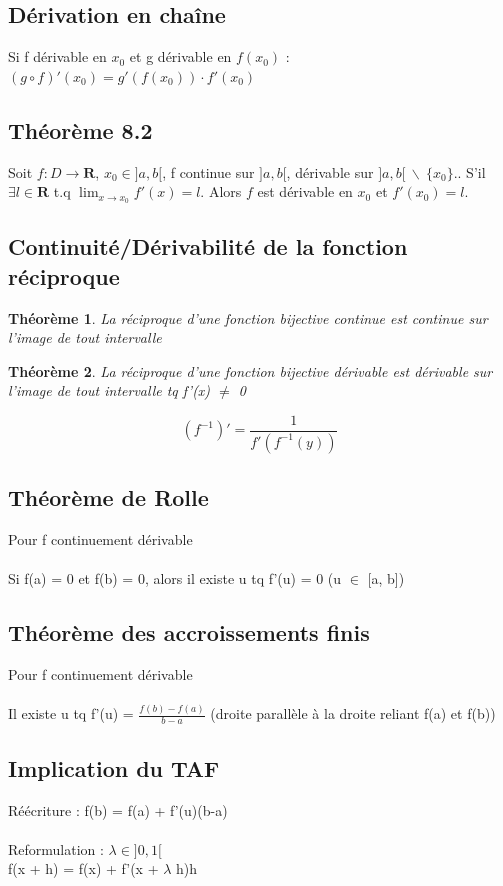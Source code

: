\documentclass{article}
\newtheorem{theorem}{Théorème}
\begin{document}
\subsection{Dérivation en chaîne}

Si f dérivable en $ x_0 $ et g dérivable en $ f(x_0) $ :\\
$(g \circ f)'(x_0) = g'(f(x_0)) \cdot f'(x_0)$

\subsection{Théorème 8.2}

Soit $ f : D \to \mathbf{R} $, $ x_0 \in ]a, b[ $, f continue sur $ ]a, b[ $, dérivable sur $ ]a, b[\ \backslash\ \{x_0\}. $. S'il $ \exists l \in \mathbf{R} $ t.q $ \lim_{x\to{x_0}} f'(x) = l $. Alors $ f $ est dérivable en $ x_0 $ et $ f'(x_0) = l $.
\subsection{Continuité/Dérivabilité de la fonction réciproque}
\begin{theorem}
    La réciproque d'une fonction bijective continue est continue sur l'image de tout intervalle
\end{theorem}
\begin{theorem}
    La réciproque d'une fonction bijective dérivable est dérivable sur l'image de tout intervalle tq f'(x) $\neq$ 0
\end{theorem}
\[(f^{-1})' = \frac{1}{f'(f^{-1}(y))}  \]
\subsection{Théorème de Rolle}
Pour f continuement dérivable\\\\
Si f(a) = 0 et f(b) = 0, alors il existe u tq f'(u) = 0 (u $\in$ [a, b])
\subsection{Théorème des accroissements finis}
Pour f continuement dérivable\\\\
Il existe u tq f'(u) = $\frac{f(b) - f(a)}{b - a}$ (droite parallèle à la droite reliant f(a) et f(b))
\subsection{Implication du TAF}
Réécriture : f(b) = f(a) + f'(u)(b-a) \\\\
Reformulation : $\lambda \in ]0, 1[$ \\
f(x + h) = f(x) + f'(x + $\lambda$ h)h
\end{document}

